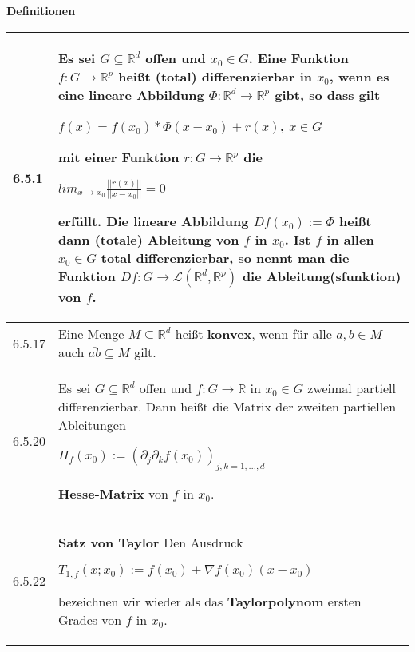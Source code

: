     \noindent
    \textbf{Definitionen}
    \begin{table}[H]  
    \begin{tabularx}{\textwidth}{X m{16cm}}
        \toprule

        6.5.1 & Es sei $G \subseteq \mathbb{R}^d$ offen und $x_0 \in G$. Eine Funktion $f: G \rightarrow \mathbb{R}^p$ heißt
                \textbf{(total) differenzierbar} in $x_0$, wenn es eine lineare Abbildung $\Phi: \mathbb{R}^d \rightarrow \mathbb{R}^p$
                gibt, so dass gilt \hfill \break
                \centerline{$ f(x) = f(x_0) * \Phi(x-x_0) + r(x)$, $x \in G$}
                mit einer Funktion $r: G \rightarrow \mathbb{R}^p$ die \hfill \break
                \centerline{$ lim_{x \rightarrow x_0} \frac{||r(x)||}{||x-x_0||} = 0 $}
                erfüllt. \hfill \break
                Die lineare Abbildung $Df(x_0) := \Phi$ heißt dann \textbf{(totale) Ableitung} von $f$ in $x_0$. Ist $f$ in allen
                $x_0 \in G$ total differenzierbar, so nennt man die Funktion $Df: G \rightarrow \mathcal{L}(\mathbb{R}^d, \mathbb{R}^p)$
                die \textbf{Ableitung(sfunktion)} von $f$. \\
        \midrule
        6.5.17& Eine Menge $M \subseteq \mathbb{R}^d$ heißt \textbf{konvex}, wenn für alle $a,b \in M$ auch $\bar{ab} \subseteq M$ gilt. \\
        \midrule
        6.5.20& Es sei $G \subseteq \mathbb{R}^d$ offen und $f: G \rightarrow \mathbb{R}$ in $x_0 \in G$ zweimal partiell differenzierbar.
                Dann heißt die Matrix der zweiten partiellen Ableitungen \hfill \break
                \centerline{$ H_f(x_0) := (\partial_j \partial_k f(x_0))_{j,k = 1,\dots,d} $}
                \textbf{Hesse-Matrix} von $f$ in $x_0$. \\
        6.5.22& \textbf{Satz von Taylor} \hfill \break
                Den Ausdruck \hfill \break
                \centerline{$ T_{1,f}(x;x_0) := f(x_0) + \nabla f(x_0)(x-x_0) $}
                bezeichnen wir wieder als das \textbf{Taylorpolynom} ersten Grades von $f$ in $x_0$. \\

        \bottomrule

    \end{tabularx}
    \end{table}

    \pagebreak

